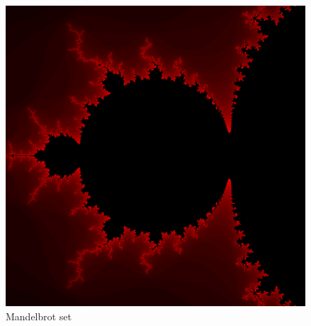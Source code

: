 \documentclass{article}
\begin{document}
\begin{figure}[H]
	\centering
	\includegraphics[scale=0.35]{figures/Mandelbrot.png}
	\caption{Mandelbrot set}
\end{figure}
\end{document}
